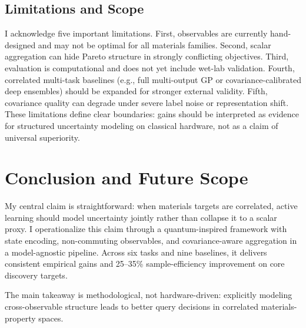 \documentclass[conference]{IEEEtran}
\begin{document}
\subsection{Limitations and Scope}
I acknowledge five important limitations. First, observables are currently hand-designed and may not be optimal for all materials families. Second, scalar aggregation can hide Pareto structure in strongly conflicting objectives. Third, evaluation is computational and does not yet include wet-lab validation. Fourth, correlated multi-task baselines (e.g., full multi-output GP or covariance-calibrated deep ensembles) should be expanded for stronger external validity. Fifth, covariance quality can degrade under severe label noise or representation shift. These limitations define clear boundaries: gains should be interpreted as evidence for structured uncertainty modeling on classical hardware, not as a claim of universal superiority.

\section{Conclusion and Future Scope}

My central claim is straightforward: when materials targets are correlated, active learning should model uncertainty jointly rather than collapse it to a scalar proxy. I operationalize this claim through a quantum-inspired framework with state encoding, non-commuting observables, and covariance-aware aggregation in a model-agnostic pipeline. Across six tasks and nine baselines, it delivers consistent empirical gains and 25--35\% sample-efficiency improvement on core discovery targets.

The main takeaway is methodological, not hardware-driven: explicitly modeling cross-observable structure leads to better query decisions in correlated materials-property spaces.
\end{document}
